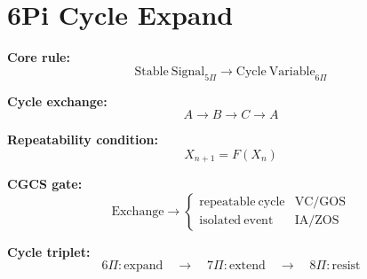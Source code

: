 \section*{6Pi Cycle Expand}

\textbf{Core rule:}
\[
\mathrm{Stable\ Signal}_{5\Pi}
\rightarrow
\mathrm{Cycle\ Variable}_{6\Pi}
\]

\textbf{Cycle exchange:}
\[
A \rightarrow B \rightarrow C \rightarrow A
\]

\textbf{Repeatability condition:}
\[
X_{n+1} = F(X_n)
\]

\textbf{CGCS gate:}
\[
\mathrm{Exchange} \rightarrow
\begin{cases}
\mathrm{repeatable\ cycle} & \text{VC/GOS} \\
\mathrm{isolated\ event} & \text{IA/ZOS}
\end{cases}
\]

\textbf{Cycle triplet:}
\[
6\Pi:\mathrm{expand}
\quad\rightarrow\quad
7\Pi:\mathrm{extend}
\quad\rightarrow\quad
8\Pi:\mathrm{resist}
\]
